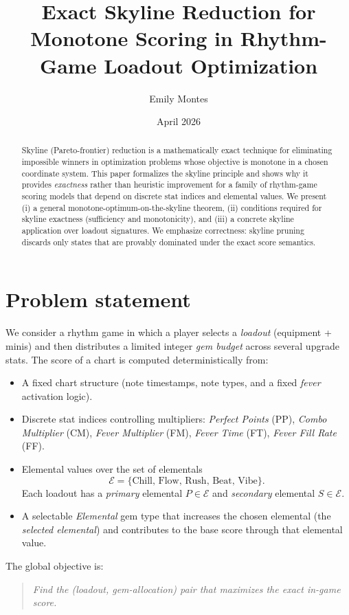 \documentclass[11pt]{article}
\title{Exact Skyline Reduction for Monotone Scoring in Rhythm-Game Loadout Optimization}
\author{Emily Montes}
\date{April 2026}
\theoremstyle{plain}
\begin{document}
\maketitle

\begin{abstract}
Skyline (Pareto-frontier) reduction is a mathematically exact technique for eliminating impossible winners in optimization problems whose objective is monotone in a chosen coordinate system. This paper formalizes the skyline principle and shows why it provides \emph{exactness} rather than heuristic improvement for a family of rhythm-game scoring models that depend on discrete stat indices and elemental values. We present (i) a general monotone-optimum-on-the-skyline theorem, (ii) conditions required for skyline exactness (sufficiency and monotonicity), and (iii) a concrete skyline application over loadout signatures. We emphasize correctness: skyline pruning discards only states that are provably dominated under the exact score semantics.
\end{abstract}

\section{Problem statement}
We consider a rhythm game in which a player selects a \emph{loadout} (equipment + minis) and then distributes a limited integer \emph{gem budget} across several upgrade stats. The score of a chart is computed deterministically from:
\begin{itemize}
  \item A fixed chart structure (note timestamps, note types, and a fixed \emph{fever} activation logic).
  \item Discrete stat indices controlling multipliers: \emph{Perfect Points} (PP), \emph{Combo Multiplier} (CM), \emph{Fever Multiplier} (FM), \emph{Fever Time} (FT), \emph{Fever Fill Rate} (FF).
  \item Elemental values over the set of elementals
  \[ \mathcal{E} = \{\text{Chill},\,\text{Flow},\,\text{Rush},\,\text{Beat},\,\text{Vibe}\}. \]
  Each loadout has a \emph{primary} elemental $P\in\mathcal{E}$ and \emph{secondary} elemental $S\in\mathcal{E}$.
  \item A selectable \emph{Elemental} gem type that increases the chosen elemental (the \emph{selected elemental}) and contributes to the base score through that elemental value.
\end{itemize}

The global objective is:
\begin{quote}
\emph{Find the (loadout, gem-allocation) pair that maximizes the exact in-game score.}
\end{quote}
\end{document}

